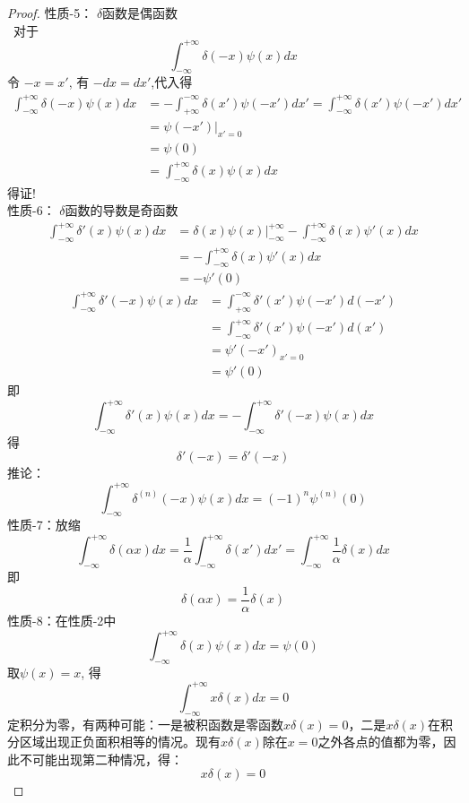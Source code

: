 \begin{proof} 性质-5： $\delta$函数是偶函数 \\
	~对于$$\int_{-\infty}^{+\infty} \delta(-x) \psi (x) d x$$ 令 $-x =x'$, 有 $-dx = dx'$,代入得 
	\[
		\begin{aligned}
			\int_{-\infty}^{+\infty} \delta(-x) \psi (x) d x &= -\int_{+\infty}^{-\infty} \delta(x') \psi (-x') d x' = \int_{-\infty}^{+\infty} \delta(x') \psi (-x') d x' \\
			&=  \psi (-x') | _{x'=0}\\
			&=  \psi (0) \\
			&=  \int_{-\infty}^{+\infty} \delta(x) \psi (x) d x 
		\end{aligned}
		   \]
		得证! \\ 
	性质-6： $\delta$函数的导数是奇函数
	\[
		\begin{aligned}
		  \int_{-\infty}^{+\infty} \delta'(x) \psi (x) d x &= \delta(x) \psi (x)|_{-\infty}^{+\infty} - \int_{-\infty}^{+\infty} \delta(x) \psi' (x) d x \\
			&=  - \int_{-\infty}^{+\infty} \delta(x) \psi' (x) d x \\
			&=  - \psi' (0)
		\end{aligned}\]
	\[
			\begin{aligned}
			  \int_{-\infty}^{+\infty} \delta'(-x) \psi (x) d x &= \int_{+\infty}^{-\infty} \delta'(x') \psi (-x') d (-x') \\
				&= \int_{-\infty}^{+\infty} \delta'(x') \psi (-x') d (x') \\
				&=  \psi' (-x') _{x'=0}\\
				&=  \psi' (0) 
			\end{aligned}
			   \]
	即
	\[\int_{-\infty}^{+\infty} \delta'(x) \psi (x) d x = - \int_{-\infty}^{+\infty} \delta'(-x) \psi (x) d x\]
	得 \[\delta'(-x)   = \delta'(-x) \] 
	推论：\[ \int_{-\infty}^{+\infty} \delta^{(n)}(-x) \psi (x) d x = (-1)^n \psi^{(n)} (0)\]
	性质-7：放缩
	\[\int_{-\infty}^{+\infty} \delta(\alpha x) d x=
	\frac{1}{\alpha}\int_{-\infty}^{+\infty} \delta(x') d x' =
	 \int_{-\infty}^{+\infty} \frac{1}{\alpha}\delta(x) d x\]
	 即
	 \[\delta(\alpha x)  = \frac{1}{\alpha}\delta(x)\] 
	性质-8：在性质-2中
	\[\int_{-\infty}^{+\infty} \delta(x) \psi (x) d x=\psi  (0)\] 
	取$\psi (x) =x$, 得 
	\[ \int_{-\infty}^{+\infty} x\delta(x) d x = 0\]
	定积分为零，有两种可能：一是被积函数是零函数$x\delta(x) = 0$，二是$x\delta(x)$在积分区域出现正负面积相等的情况。现有$x\delta(x)$除在$x=0$之外各点的值都为零，因此不可能出现第二种情况，得：
	\[ x\delta(x) = 0\]
\end{proof}

